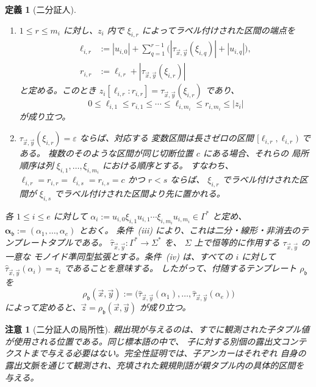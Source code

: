 \documentclass[11pt,a4paper]{ltjsarticle}
\newtheorem{definition}[theorem]{定義}
\newtheorem{remark}[theorem]{注意}
\theoremstyle{remark}
\newcommand{\tuple}[1]{\vec{#1}}
\newcommand{\eps}{\varepsilon}
\begin{document}
\begin{definition}[二分証人]
\begin{enumerate}[label=(\roman*),leftmargin=*]
\item \(1\le r\le m_i\) に対し、\(z_i\) 内で
      \(\xi_{i,r}\) によってラベル付けされた区間の端点を
      \[
      \begin{aligned}
        \ell_{i,r}
        &:={}|u_{i,0}|+\sum_{q=1}^{r-1}
        \bigl(|\tau_{\tuple x,\tuple y}(\xi_{i,q})|+|u_{i,q}|\bigr),\\
        r_{i,r}
        &:={\ell_{i,r}}+|\tau_{\tuple x,\tuple y}(\xi_{i,r})|
      \end{aligned}
      \]
      と定める。このとき
      \(z_i[\ell_{i,r}:r_{i,r}]=\tau_{\tuple x,\tuple y}(\xi_{i,r})\) であり、
      \[
        0\le\ell_{i,1}\le r_{i,1}\le\cdots\le
        \ell_{i,m_i}\le r_{i,m_i}\le|z_i|
      \]
      が成り立つ。

\item \(\tau_{\tuple x,\tuple y}(\xi_{i,r})=\eps\) ならば、対応する
      変数区間は長さゼロの区間 \([\ell_{i,r},\ell_{i,r})\) である。
      複数のそのような区間が同じ切断位置 \(c\) にある場合、それらの
      局所順序は列 \(\xi_{i,1},\ldots,\xi_{i,m_i}\) における順序とする。
      すなわち、
      \(\ell_{i,r}=r_{i,r}=\ell_{i,s}=r_{i,s}=c\) かつ \(r<s\) ならば、
      \(\xi_{i,r}\) でラベル付けされた区間が
      \(\xi_{i,s}\) でラベル付けされた区間より先に置かれる。
\end{enumerate}

各 \(1\le i\le e\) に対して
\(\alpha_i:=u_{i,0}\xi_{i,1}u_{i,1}\cdots
\xi_{i,m_i}u_{i,m_i}\in\Gamma^*\) と定め、
\(\boldsymbol\alpha_{\mathfrak b}:=(\alpha_1,\ldots,\alpha_e)\) とおく。
条件~(iii) により、これは二分・線形・非消去のテンプレートタプルである。
\(\widehat\tau_{\tuple x,\tuple y}:\Gamma^*\to\Sigma^*\) を、
\(\Sigma\) 上で恒等的に作用する \(\tau_{\tuple x,\tuple y}\) の一意な
モノイド準同型拡張とする。条件~(iv) は、すべての \(i\) に対して
\(\widehat\tau_{\tuple x,\tuple y}(\alpha_i)=z_i\) であることを意味する。
したがって、付随するテンプレート \(\rho_{\mathfrak b}\) を
\[
  \rho_{\mathfrak b}(\tuple x,\tuple y):=
  \bigl(\widehat\tau_{\tuple x,\tuple y}(\alpha_1),\ldots,
        \widehat\tau_{\tuple x,\tuple y}(\alpha_e)\bigr)
\]
によって定めると、\(\tuple z=\rho_{\mathfrak b}(\tuple x,\tuple y)\) が成り立つ。
\end{definition}

\begin{remark}[二分証人の局所性]
\label{rem:binary-witness-locality}
親出現が与えるのは、すでに観測された子タプル値が使用される位置である。同じ標本語の中で、
子に対する別個の露出文コンテクストまで与える必要はない。完全性証明では、子アンカーはそれぞれ
自身の露出文脈を通じて観測され、充填された親規則語が親タプル内の具体的区間を与える。
\end{remark}
\end{document}
